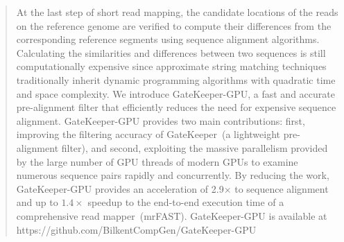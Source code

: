 \begin{abstract}
\justifying
At the last step of short read mapping, the candidate locations of the reads on the reference genome are verified to compute their differences from the corresponding reference segments using sequence alignment algorithms. Calculating the similarities and differences between two sequences is still computationally expensive since approximate string matching techniques traditionally inherit dynamic programming algorithms with quadratic time and space complexity. We introduce GateKeeper-GPU, a fast and accurate pre-alignment filter that efficiently reduces the need for expensive sequence alignment. GateKeeper-GPU provides two main contributions: first, improving the filtering accuracy of GateKeeper~(a lightweight pre-alignment filter), and second, exploiting the massive parallelism provided by the large number of GPU threads of modern GPUs to examine numerous sequence pairs rapidly and concurrently. By reducing the work, GateKeeper-GPU provides an acceleration of 2.9× to sequence alignment and up to $1.4\times$ speedup to the end-to-end execution time of a comprehensive read mapper~(mrFAST). GateKeeper-GPU is available at https://github.com/BilkentCompGen/GateKeeper-GPU
\end{abstract}